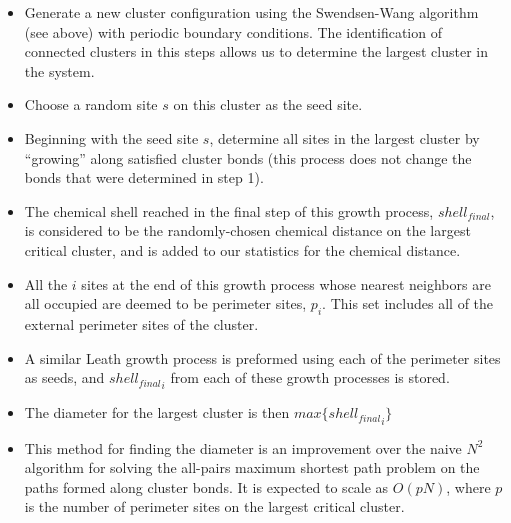 \documentclass{umthesis}          %
\begin{document}
\begin{itemize}

\item Generate a new cluster configuration using the Swendsen-Wang algorithm (see above) with periodic boundary conditions. The identification of connected clusters in this steps allows us to determine the largest cluster in the system.\\
\label{sec-4.2.3.1}


\item Choose a random site $s$ on this cluster as the seed site.\\
\label{sec-4.2.3.2}


\item Beginning with the seed site $s$, determine all sites in the largest cluster by ``growing'' along satisfied cluster bonds (this process does not change the bonds that were determined in step 1).\\
\label{sec-4.2.3.3}


\item The chemical shell reached in the final step of this growth process, $shell_{final}$, is considered to be the randomly-chosen chemical distance on the largest critical cluster, and is added to our statistics for the chemical distance.\\
\label{sec-4.2.3.4}


\item All the $i$ sites at the end of this growth process whose nearest neighbors are all occupied are deemed to be perimeter sites, $p_i$.  This set includes all of the external perimeter sites of the cluster.\\
\label{sec-4.2.3.5}


\item A similar Leath growth process is preformed using each of the perimeter sites as seeds, and ${shell_{final}}_i$ from each of these growth processes is stored.\\
\label{sec-4.2.3.6}


\item The diameter for the largest cluster is then $max\{{shell_{final}}_i\}$\\
\label{sec-4.2.3.7}


\item This method for finding the diameter is an improvement over the naive $N^2$ algorithm for solving the all-pairs maximum shortest path problem on the paths formed along cluster bonds. It is expected to scale as $O(pN)$, where $p$ is the number of perimeter sites on the largest critical cluster.\\
\label{sec-4.2.3.8}

\end{itemize} %
\end{document}
